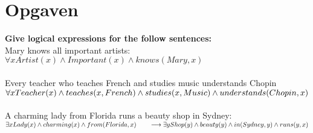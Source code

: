 \documentclass[12pt]{article}
\begin{document}
\maketitle

\section{Opgaven}

\textbf{Give logical expressions for the follow sentences:}\\
Mary knows all important artists:\\
$\forall xArtist(x) \wedge Important(x) \wedge knows(Mary, x)$\\
\\
Every teacher who teaches French and studies music understands Chopin\\
$\forall xTeacher(x) \wedge teaches(x, French) \wedge\\ studies(x, Music) \wedge understands(Chopin, x)$\\
\\
A charming lady from Florida runs a beauty shop in Sydney:\\
$\exists xLady(x) \wedge charming(x) \wedge  from(Florida,x)\\
\hspace*{2em} \longrightarrow\\
\exists yShop(y) \wedge beauty(y) \wedge in(Sydney, y) \wedge runs(y,x)$
\end{document}

